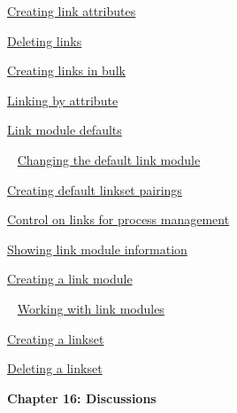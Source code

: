 \documentclass[11pt,a4paper]{article}
\begin{document}
\href{https://www.ibm.com/support/knowledgecenter/search/Creating%20link%20attributes?scope=SSYQBZ_9.6.1}{Creating link attributes}

\href{https://www.ibm.com/support/knowledgecenter/search/Deleting%20links?scope=SSYQBZ_9.6.1}{Deleting links}

\href{https://www.ibm.com/support/knowledgecenter/search/Creating%20links%20in%20bulk?scope=SSYQBZ_9.6.1}{Creating links in bulk}

\href{https://www.ibm.com/support/knowledgecenter/search/Linking%20by%20attribute?scope=SSYQBZ_9.6.1}{Linking by attribute}

\href{https://www.ibm.com/support/knowledgecenter/search/Link%20module%20defaults?scope=SSYQBZ_9.6.1}{Link module defaults}

\,\,\, \href{https://www.ibm.com/support/knowledgecenter/search/Changing%20the%20default%20link%20module?scope=SSYQBZ_9.6.1}{Changing the default link module}

\href{https://www.ibm.com/support/knowledgecenter/search/Creating%20default%20linkset%20pairings?scope=SSYQBZ_9.6.1}{Creating default linkset pairings}

\href{https://www.ibm.com/support/knowledgecenter/search/Control%20on%20links%20for%20process%20management?scope=SSYQBZ_9.6.1}{Control on links for process management}

\href{https://www.ibm.com/support/knowledgecenter/search/Showing%20link%20module%20information?scope=SSYQBZ_9.6.1}{Showing link module information}

\href{https://www.ibm.com/support/knowledgecenter/search/Creating%20a%20link%20module?scope=SSYQBZ_9.6.1}{Creating a link module}

\,\,\, \href{https://www.ibm.com/support/knowledgecenter/search/Working%20with%20link%20modules?scope=SSYQBZ_9.6.1}{Working with link modules}

\href{https://www.ibm.com/support/knowledgecenter/search/Creating%20a%20linkset?scope=SSYQBZ_9.6.1}{Creating a linkset}

\href{https://www.ibm.com/support/knowledgecenter/search/Deleting%20a%20linkset?scope=SSYQBZ_9.6.1}{Deleting a linkset} \\



\begin{Large}\textbf{Chapter 16: Discussions} \end{Large} 
\vspace{1mm}
\end{document}
